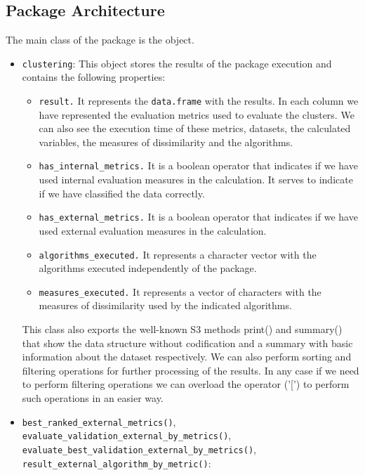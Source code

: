 \subsection{Package Architecture}

The main class of the package is the  object.
\begin{itemize}
    \item \texttt{clustering}: This object stores the results of the  package execution and contains the following properties:
    \begin{itemize}
        \item \texttt{result.} It represents the \texttt{data.frame} with the results. In each column we have represented the evaluation metrics used to evaluate the clusters. We can also see the execution time of these metrics, datasets, the calculated variables, the measures of dissimilarity and the algorithms.
        \item \texttt{has\_internal\_metrics.} It is a boolean operator that indicates if we have used internal evaluation measures in the calculation. It serves to indicate if we have classified the data correctly.
        \item \texttt{has\_external\_metrics.} It is a boolean operator that indicates if we have used external evaluation measures in the calculation.
        \item \texttt{algorithms\_executed.} It represents a character vector with the algorithms executed independently of the package.
        \item \texttt{measures\_executed.} It represents a vector of characters with the measures of dissimilarity used by the indicated algorithms.
    \end{itemize}
    This class also exports the well-known S3 methods print() and summary() that show the data
structure without codification and a summary with basic information about the dataset respectively. We can also perform sorting and filtering operations for further processing of the results. In any case if we need to perform filtering operations we can overload the operator ('[') to perform such operations in an easier way.
    \item \texttt{best\_ranked\_external\_metrics()}, \texttt{evaluate\_validation\_external\_by\_metrics()},\\ \texttt{evaluate\_best\_validation\_external\_by\_metrics()},\\ \texttt{result\_external\_algorithm\_by\_metric()}:

\end{itemize}
